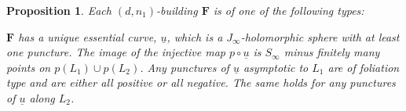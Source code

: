 \documentclass[12pt]{amsart}
\newtheorem{proposition}[theorem]{Proposition}
\theoremstyle{definition}
\begin{document}
\begin{proposition}\label{prop:type} Each  $(d,n_1)$-building  $\mathbf{ F}$ %
is of one of the following types:




\bigskip


 $\mathbf{ F}$ has a unique essential curve, $\underline{u}$, which is a $J_{\infty}$-holomorphic sphere with at least one puncture. The image of the injective map $p\circ \underline{u}$ is $S_{\infty}$ minus finitely many points on $p(L_1) \cup p(L_2)$. Any punctures of $\underline{u}$ asymptotic to $L_1$ are of foliation type and are either all positive or all negative. The same holds for any punctures of $\underline{u}$ along $L_2$. 






\end{proposition}
\end{document}
